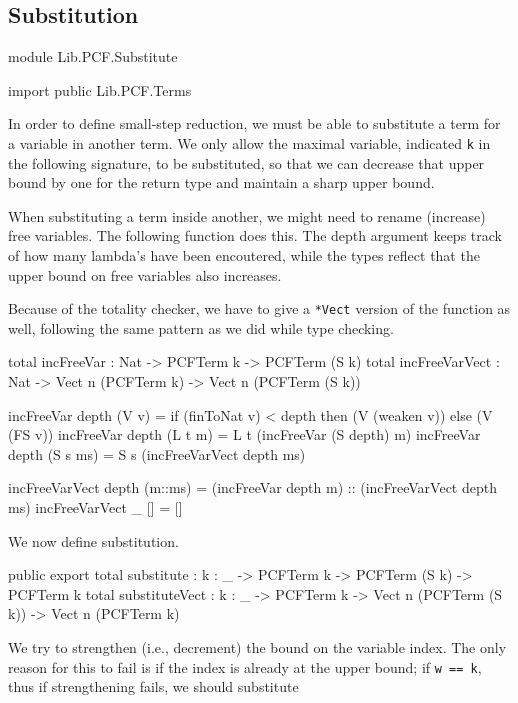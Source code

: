 \subsection{Substitution}

\begin{hidden}
module Lib.PCF.Substitute

import public Lib.PCF.Terms
\end{hidden}

In order to define small-step reduction, we must be able to substitute a term
for a variable in another term.
We only allow the maximal variable, indicated \lstinline{k} in the following signature, to be substituted,
so that we can decrease that upper bound by one for the return type and maintain a sharp upper bound.

When substituting a term inside another, we might need to rename (increase)
free variables. The following function does this.
The depth argument keeps track of how many lambda's have been encoutered,
while the types reflect that the upper bound on free variables also increases.

Because of the totality checker, we have to give a \lstinline{*Vect} version of the function as well, following
the same pattern as we did while type checking.

\begin{code}
total incFreeVar : Nat -> PCFTerm k -> PCFTerm (S k)
total incFreeVarVect : Nat -> Vect n (PCFTerm k) -> Vect n (PCFTerm (S k))

incFreeVar depth (V v)    = if (finToNat v) < depth
                              then (V (weaken v))
                            else (V (FS v))
incFreeVar depth (L t m)  = L t (incFreeVar (S depth) m)
incFreeVar depth (S s ms) = S s (incFreeVarVect depth ms)

incFreeVarVect depth (m::ms) = (incFreeVar depth m) :: (incFreeVarVect depth ms)
incFreeVarVect _     []      = []
\end{code}

We now define substitution.

\begin{code}
public export
total substitute : {k : _} -> PCFTerm k -> PCFTerm (S k) -> PCFTerm k
total substituteVect : {k : _} -> PCFTerm k -> Vect n (PCFTerm (S k)) -> Vect n (PCFTerm k)
\end{code}

We try to strengthen (i.e., decrement) the bound on the variable index.
The only reason for this to fail is if the index is already at the upper bound; if \lstinline{w == k}, thus
if strengthening fails, we should substitute

